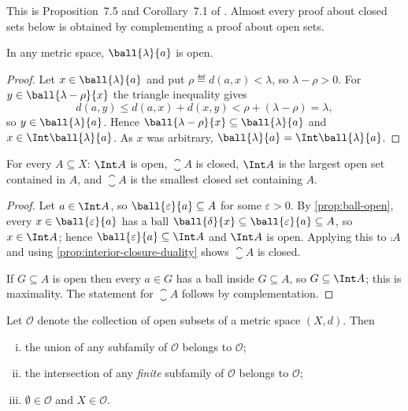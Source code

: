 This is Proposition~7.5 and Corollary~7.1 of \textcite{fukuda2026notes}
\autocite[slide 35]{fukuda2026analysis}. Almost every proof about closed sets
below is obtained by complementing a proof about open sets.

\begin{proposition}\label{prop:ball-open}
	In any metric space, $\ball{\lambda}{a}$ is open.
\end{proposition}

\begin{proof}
	Let $x\in\ball{\lambda}{a}$ and put $\rho\eqdef d(a,x)<\lambda$, so
	$\lambda-\rho>0$. For $y\in\ball{\lambda-\rho}{x}$ the triangle inequality gives
	\[
		d(a,y)\leq d(a,x)+d(x,y)<\rho+(\lambda-\rho)=\lambda,
	\]
	so $y\in\ball{\lambda}{a}$. Hence $\ball{\lambda-\rho}{x}\subseteq
		\ball{\lambda}{a}$ and $x\in\Int\ball{\lambda}{a}$. As $x$ was arbitrary,
	$\ball{\lambda}{a}=\Int\ball{\lambda}{a}$.
\end{proof}

\begin{proposition}\label{prop:int-open}
	For every $A\subseteq X$: $\Int A$ is open, $\closure{A}$ is closed, $\Int A$ is
	the largest open set contained in $A$, and $\closure A$ is the smallest closed
	set containing $A$.
\end{proposition}

\begin{proof}
	Let $a\in\Int A$, so $\ball{\varepsilon}{a}\subseteq A$ for some
	$\varepsilon>0$. By \autoref{prop:ball-open}, every $x\in\ball{\varepsilon}{a}$
	has a ball $\ball{\delta}{x}\subseteq\ball{\varepsilon}{a}\subseteq A$, so
	$x\in\Int A$; hence $\ball{\varepsilon}{a}\subseteq\Int A$ and $\Int A$ is open.
	Applying this to $\comp A$ and using \autoref{prop:interior-closure-duality}
	shows $\closure A$ is closed.

	If $G\subseteq A$ is open then every $a\in G$ has a ball inside $G\subseteq A$,
	so $G\subseteq\Int A$; this is maximality. The statement for $\closure A$
	follows by complementation.
\end{proof}

\begin{theorem}\label{thm:topology-axioms}
	Let $\mathcal{O}$ denote the collection of open subsets of a metric space
	$(X,d)$. Then
	\begin{enumerate}[(i)]
		\item the union of any subfamily of $\mathcal{O}$ belongs to $\mathcal{O}$;
		\item the intersection of any \emph{finite} subfamily of $\mathcal{O}$ belongs
		      to $\mathcal{O}$;
		\item $\emptyset\in\mathcal{O}$ and $X\in\mathcal{O}$.
	\end{enumerate}
\end{theorem}

